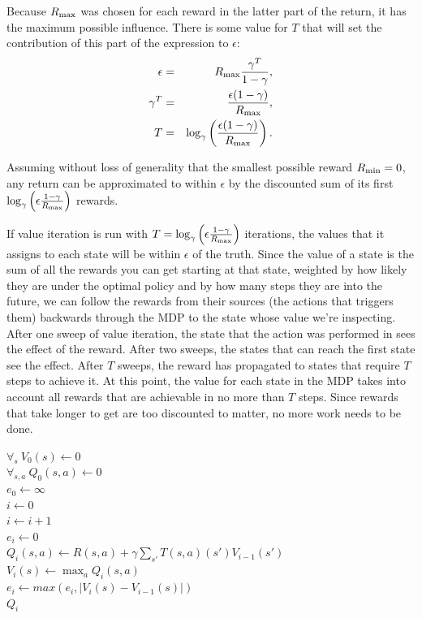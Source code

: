Because $R_{\rm max}$ was chosen for each reward in the latter part of the return, it has the maximum possible influence. There is some value for $T$ that will set the contribution of this part of the expression to $\epsilon$:
\begin{eqnarray}
\epsilon &=& R_{\rm max} \frac{\gamma^T}{1-\gamma},\\
{\gamma^T} &=& \frac {\epsilon (1-\gamma)} {R_{\rm max}},\\
T &=& \log_\gamma\left(\frac {\epsilon (1-\gamma)} {R_{\rm max}}\right).
\end{eqnarray}

Assuming without loss of generality that the smallest possible reward $R_{\rm min}=0$, any return can be approximated to within $\epsilon$ by the discounted sum of its first $\log_\gamma\left(\epsilon \frac {1-\gamma} {R_{\rm max}}\right)$ rewards. 

If value iteration is run with $T=\log_\gamma\left(\epsilon \frac {1-\gamma} {R_{\rm max}}\right)$ iterations, the values that it assigns to each state will be within $\epsilon$ of the truth. Since the value of a state is the sum of all the rewards you can get starting at that state, weighted by how likely they are under the optimal policy and by how many steps they are into the future, we can follow the rewards from their sources (the actions that triggers them) backwards through the MDP to the state whose value we're inspecting. After one sweep of value iteration, the state that the action was performed in sees the effect of the reward. After two sweeps, the states that can reach the first state see the effect. After $T$ sweeps, the reward has propagated to states that require $T$ steps to achieve it. At this point, the value for each state in the MDP takes into account all rewards that are achievable in no more than $T$ steps. Since rewards that take longer to get are too discounted to matter, no more work needs to be done. 

\begin{algorithm}[tb]
	\caption{$\mbox{Value iteration}(S, A, R, T, \gamma, \epsilon)$}
	\label{alg:vi}
	$\forall_s\ V_0(s)\leftarrow 0$\\
	$\forall_{s,a}\ Q_0(s,a)\leftarrow 0$\\
	$e_0 \leftarrow \infty$\\
	$i \leftarrow 0$\\
	 {
		$i \leftarrow i+1$\\
		$e_i \leftarrow 0$\\
		 {
			 {
				$Q_i(s,a) \leftarrow R(s,a) + \gamma \sum_{s'} T(s,a)(s') V_{i-1}(s')$
			}
			$V_i(s) \leftarrow \max_a Q_i(s,a)$\\
			$e_i \leftarrow max(e_i, |V_i(s)-V_{i-1}(s)|)$\\
		}
	}
	\Return $Q_i$
\end{algorithm}

